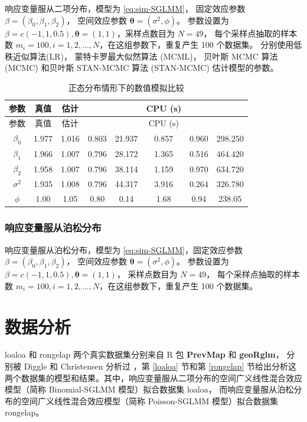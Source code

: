 \documentclass[12pt,a4paper,UTF8,twoside]{book}
\theoremstyle{definition}
\theoremstyle{definition}
\theoremstyle{definition}
\theoremstyle{remark}
\begin{document}
响应变量服从二项分布，模型为 \eqref{eq:sim-SGLMM}， 固定效应参数
\(\beta = (\beta_0,\beta_1,\beta_2)\)， 空间效应参数
\(\boldsymbol{\theta} = (\sigma^2,\phi)\)。 参数设置为
\(\beta = c(-1,1,0.5), \boldsymbol{\theta} = (1,1)\)，采样点数目为
\(N=49\)， 每个采样点抽取的样本数
\(m_i = 100,i = 1,2,\ldots,N\)，在这组参数下，重复产生 100 个数据集。
分别使用低秩近似算法(LR)， 蒙特卡罗最大似然算法 (MCML)， 贝叶斯 MCMC
算法 (MCMC) 和贝叶斯 STAN-MCMC 算法 (STAN-MCMC) 估计模型的参数。

\begin{longtable}[]{@{}cccccccc@{}}
\caption{\label{tab:simulation-norm}
正态分布情形下的数值模拟比较}\tabularnewline
\toprule
参数 & 真值 & 估计 & & & CPU (s) & &\tabularnewline
\midrule
\endfirsthead
\toprule
参数 & 真值 & 估计 & & & CPU (s) & &\tabularnewline
\midrule
\endhead
\(\beta_{0}\) & 1.977 & 1.016 & 0.803 & 21.937 & 0.857 & 0.960 &
298.250\tabularnewline
\(\beta_{1}\) & 1.966 & 1.007 & 0.796 & 28.172 & 1.365 & 0.516 &
464.420\tabularnewline
\(\beta_{2}\) & 1.958 & 1.007 & 0.796 & 38.114 & 1.159 & 0.970 &
634.720\tabularnewline
\(\sigma^2\) & 1.935 & 1.008 & 0.796 & 44.317 & 3.916 & 0.264 &
326.780\tabularnewline
\(\phi\) & 1.00 & 1.05 & 0.80 & 0.14 & 1.68 & 0.94 &
238.05\tabularnewline
\bottomrule
\end{longtable}

\hypertarget{possion-sglmm}{%
\subsection{响应变量服从泊松分布}\label{possion-sglmm}}

响应变量服从泊松分布，模型为 \eqref{eq:sim-SGLMM}，固定效应参数
\(\beta = (\beta_0, \beta_1, \beta_2)\)， 空间效应参数
\(\boldsymbol{\theta} = (\sigma^2,\phi)\)。 参数设置为
\(\beta = c(-1,1,0.5), \boldsymbol{\theta} = (1,1)\)， 采样点数目为
\(N=49\)， 每个采样点抽取的样本数
\(m_i = 100,i = 1,2,\ldots,N\)，在这组参数下，重复产生 100 个数据集。

\hypertarget{applications}{%
\chapter{数据分析}\label{applications}}

loaloa 和 rongelap 两个真实数据集分别来自 R 包 \textbf{PrevMap} 和
\textbf{geoRglm}， 分别被 Diggle 和 Christensen 分析过
\citep{Christensen2004, Diggle2007ATMP}，第 \ref{loaloa} 节和第
\ref{rongelap}
节给出分析这两个数据集的模型和结果。其中，响应变量服从二项分布的空间广义线性混合效应模型（简称
Binomial-SGLMM 模型）拟合数据集 loaloa，
而响应变量服从泊松分布的空间广义线性混合效应模型（简称 Poisson-SGLMM
模型）拟合数据集 rongelap。
\end{document}
